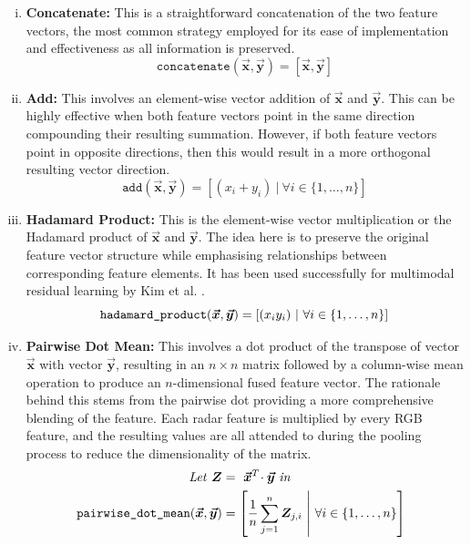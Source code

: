\documentclass{mpaper}
\newcommand{\verbtt}[1]{
  \text{\normalfont\ttfamily\detokenize{#1}}
}
\begin{document}
\begin{enumerate}[i.]
    \itemsep-0.1cm
    \item \textbf{Concatenate:} This is a straightforward concatenation of the two feature vectors, the most common strategy employed for its ease of implementation and effectiveness as all information is preserved.
    $$\mathtt{concatenate}(\bm{\vec{x}}, \bm{\vec{y}}) = \left[\bm{\vec{x}}, \bm{\vec{y}}\right]$$

    \item \textbf{Add:} This involves an element-wise vector addition of $\bm{\vec{x}}$ and $\bm{\vec{y}}$. This can be highly effective when both feature vectors point in the same direction compounding their resulting summation. However, if both feature vectors point in opposite directions, then this would result in a more orthogonal resulting vector direction.
    $$\mathtt{add}(\bm{\vec{x}}, \bm{\vec{y}}) = \left[(x_i + y_i) \ | \ \forall i \in \{1, \ldots, n\}\right]$$
    
    \item \textbf{Hadamard Product:} This is the element-wise vector multiplication or the Hadamard product of $\bm{\vec{x}}$ and $\bm{\vec{y}}$. The idea here is to preserve the original feature vector structure while emphasising relationships between corresponding feature elements. It has been used successfully for multimodal residual learning by Kim et al. \cite{kim2016multimodal}.
    $$\verb|hadamard_product|(\bm{\vec{x}}, \bm{\vec{y}}) = \left[(x_iy_i) \ | \ \forall i \in \{1, \ldots, n\}\right]$$
    
    \item \textbf{Pairwise Dot Mean:} This involves a dot product of the transpose of vector $\bm{\vec{x}}$ with vector $\bm{\vec{y}}$, resulting in an $n \times n$ matrix followed by a column-wise mean operation to produce an $n$-dimensional fused feature vector. The rationale behind this stems from the pairwise dot providing a more comprehensive blending of the feature. Each radar feature is multiplied by every RGB feature, and the resulting values are all attended to during the pooling process to reduce the dimensionality of the matrix.
    \begin{align*}
        \mathit{Let} \ \bm{Z} & = \ \bm{\vec{x}}^T\!\cdot \bm{\vec{y}} \ \mathit{in} \\
        \hspace{-0.2cm}\verbtt{pairwise_dot_mean}(\bm{\vec{x}}, \bm{\vec{y}}) &= \left[ \frac{1}{n} \sum_{j=1}^n \bm{Z}_{j,i} \ \middle| \ \forall i \in \{1, \ldots, n\}\right]
    \end{align*}
    

\end{enumerate}
\end{document}
